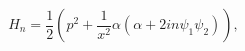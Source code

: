 \begin{equation}
H_n=\frac{1}{2}
\left(p^2+\frac{1}{x^2}\alpha(\alpha+2in\psi_1
\psi_2)\right),
\label{hnclas}
\end{equation}

